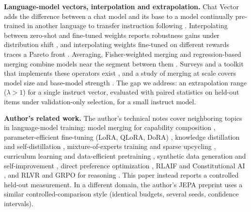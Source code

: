 \documentclass[conference]{IEEEtran}
\begin{document}
\textbf{Language-model vectors, interpolation and extrapolation.} Chat Vector adds the difference between a chat model and its base to a model continually pre-trained in another language to transfer instruction following \cite{huang2023chatvector}. Interpolating between zero-shot and fine-tuned weights reports robustness gains under distribution shift \cite{wortsman2022wiseft}, and interpolating weights fine-tuned on different rewards traces a Pareto front \cite{rame2023rewarded}. Averaging, Fisher-weighted merging and regression-based merging combine models near the segment between them \cite{wortsman2022soups,matena2021fisher,jin2022dataless}. Surveys and a toolkit that implements these operators exist \cite{yang2024survey,goddard2024mergekit}, and a study of merging at scale covers model size and base-model strength \cite{yadav2024matters}. The gap we address: an extrapolation range ($\lambda>1$) for a single instruct vector, evaluated with paired statistics on held-out items under validation-only selection, for a small instruct model.

\textbf{Author's related work.} The author's technical notes cover neighboring topics in language-model training: model merging for capability composition \cite{santos2026modelmergingfo}, parameter-efficient fine-tuning (LoRA, QLoRA, DoRA) \cite{santos2026parametereffic}, knowledge distillation and self-distillation \cite{santos2026knowledgedisti}, mixture-of-experts training and sparse upcycling \cite{santos2026mixtureofexper}, curriculum learning and data-efficient pretraining \cite{santos2026curriculumlear}, synthetic data generation and self-improvement \cite{santos2026syntheticdatag}, direct preference optimization \cite{santos2026directpreferen}, RLAIF and Constitutional AI \cite{santos2026rlaifandconsti}, and RLVR and GRPO for reasoning \cite{santos2026reinforcementl}. This paper instead reports a controlled held-out measurement. In a different domain, the author's JEPA preprint \cite{santos2026collapseresist} uses a similar controlled-comparison style (identical budgets, several seeds, confidence intervals).
\end{document}
